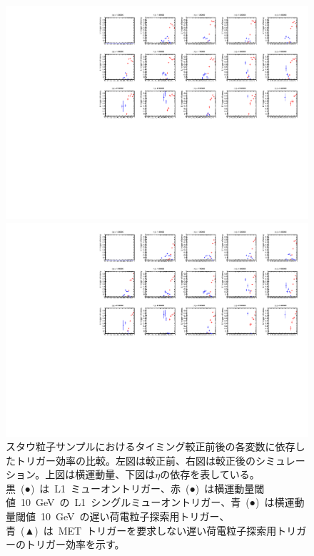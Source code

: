 \begin{figure}[tbp]
\begin{minipage}{0.49\hsize}
    \end{minipage}\\
    \begin{minipage}{0.49\hsize}
    \centering   
    \includegraphics[width=\textwidth,page=9]{img/rec/stau_600_ori.pdf}
    \end{minipage}
    \begin{minipage}{0.49\hsize}
    \centering   
    \includegraphics[width=\textwidth,page=9]{img/rec/stau_600.pdf}
    \end{minipage}
    \caption[スタウ粒子サンプルにおけるタイミング較正前後の各変数に依存したトリガー効率の比較]{スタウ粒子サンプルにおけるタイミング較正前後の各変数に依存したトリガー効率の比較。左図は較正前、右図は較正後のシミュレーション。上図は横運動量、下図は$\eta$の依存を表している。黒~(●)~は~L1~ミューオントリガー、赤~(●)~は横運動量閾値~10~GeV~の~L1~シングルミューオントリガー、青~(●)~は横運動量閾値~10~GeV~の遅い荷電粒子探索用トリガー、青~(▲)~は~MET~トリガーを要求しない遅い荷電粒子探索用トリガーのトリガー効率を示す。}\label{fig:tript}
\end{figure}
